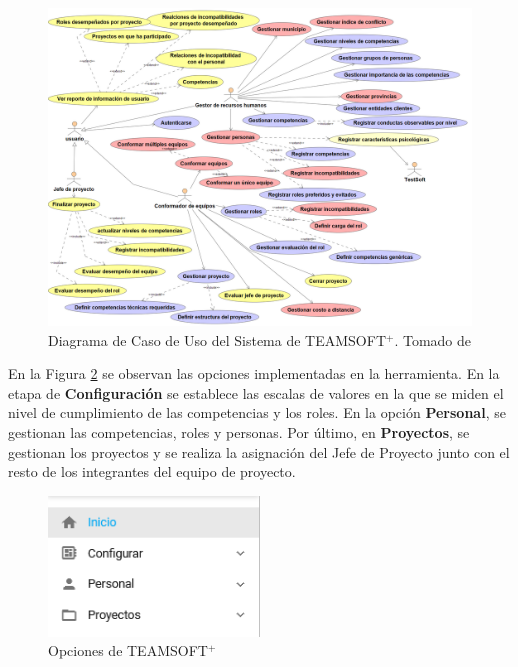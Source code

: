\begin{figure}[H]
	\hspace{-1.5cm}
	\includegraphics[width=1.2\textwidth]{figuras/diagrama_CUTeamSoft.png} 
	\caption{Diagrama de Caso de Uso del Sistema de TEAMSOFT$^+$. Tomado de \cite{Duran2019}}  \label{fig:cuteamsoft}
\end{figure}

En la Figura \ref{fig:opcines_teamsoft} se observan las opciones implementadas en la herramienta. En la etapa de \textbf{Configuración} se establece las escalas de valores en la que se miden el nivel de cumplimiento de las competencias y los roles. En la opción \textbf{Personal}, se gestionan las competencias, roles y personas. Por último, en \textbf{Proyectos}, se gestionan los proyectos y se realiza la asignación del Jefe de Proyecto junto con el resto de los integrantes del equipo de proyecto.\\

\begin{figure}[H]
	\centering
	\includegraphics[width=0.5\textwidth]{figuras/opciones_team_soft.png} 
	\caption{Opciones de TEAMSOFT$^+$}\label{fig:opcines_teamsoft}
\end{figure}


